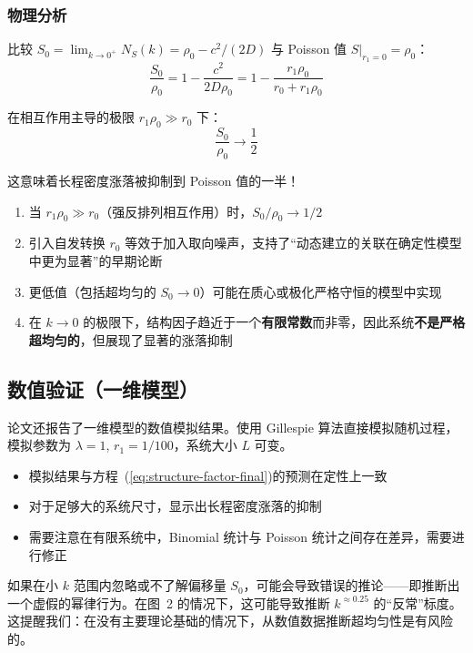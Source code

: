 \subsubsection{物理分析}

比较 $S_0 = \lim_{k\to 0^+} N_S(k) = \rho_0 - c^2/(2D)$ 与 Poisson 值 $S|_{r_1=0} = \rho_0$：
\begin{equation}\label{eq:reduction-ratio}
\frac{S_0}{\rho_0} = 1 - \frac{c^2}{2D\rho_0} = 1 - \frac{r_1\rho_0}{r_0 + r_1\rho_0}
\end{equation}

在相互作用主导的极限 $r_1\rho_0 \gg r_0$ 下：
\begin{equation}\label{eq:limit-result}
\boxed{\frac{S_0}{\rho_0} \to \frac{1}{2}}
\end{equation}

这意味着长程密度涨落被抑制到 Poisson 值的一半！

\begin{notebox}[关键物理结论]
\begin{enumerate}
    \item 当 $r_1\rho_0 \gg r_0$（强反排列相互作用）时，$S_0/\rho_0 \to 1/2$
    \item 引入自发转换 $r_0$ 等效于加入取向噪声，支持了``动态建立的关联在确定性模型中更为显著''的早期论断
    \item 更低值（包括超均匀的 $S_0 \to 0$）可能在质心或极化严格守恒的模型中实现
    \item 在 $k \to 0$ 的极限下，结构因子趋近于一个\textbf{有限常数}而非零，因此系统\textbf{不是严格超均匀的}，但展现了显著的涨落抑制
\end{enumerate}
\end{notebox}

\subsection{数值验证（一维模型）}\label{subsec:1d-numerics}

论文还报告了一维模型的数值模拟结果。使用 Gillespie 算法\cite{boltz2025}直接模拟随机过程，模拟参数为 $\lambda = 1$, $r_1 = 1/100$，系统大小 $L$ 可变。

\begin{itemize}
    \item 模拟结果与方程~(\ref{eq:structure-factor-final})的预测在定性上一致
    \item 对于足够大的系统尺寸，显示出长程密度涨落的抑制
    \item 需要注意在有限系统中，Binomial 统计与 Poisson 统计之间存在差异，需要进行修正
\end{itemize}

\begin{remark}[有限尺寸效应与虚假超均匀性]
如果在小 $k$ 范围内忽略或不了解偏移量 $S_0$，可能会导致错误的推论——即推断出一个虚假的幂律行为。在图~2 的情况下，这可能导致推断 $k^{\approx 0.25}$ 的``反常''标度。这提醒我们：在没有主要理论基础的情况下，从数值数据推断超均匀性是有风险的。
\end{remark}
